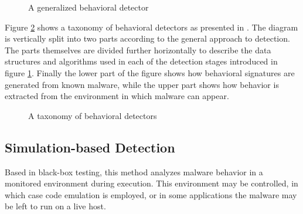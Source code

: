 \begin{figure}[H]
    \centering
    \caption{A generalized behavioral detector}
    \label{fig_gen_behav_detector}
\end{figure}

Figure \ref{fig_behav_det_tax} shows a taxonomy of behavioral detectors as presented in \cite{Jacob08}. The diagram is vertically split into two parts according to the general approach to detection. The parts themselves are divided further horizontally to describe the data structures and algorithms used in each of the detection stages introduced in figure \ref{fig_gen_behav_detector}. Finally the lower part of the figure shows how behavioral signatures are generated from known malware, while the upper part shows how behavior is extracted from the environment in which malware can appear.

\begin{figure}[H]
    \centering
    \caption{A taxonomy of behavioral detectors}
    \label{fig_behav_det_tax}
\end{figure}

\subsection{Simulation-based Detection}
Based in black-box testing, this method analyzes malware behavior in a monitored environment during execution. This environment may be controlled, in which case code emulation is employed, or in some applications the malware may be left to run on a live host.

